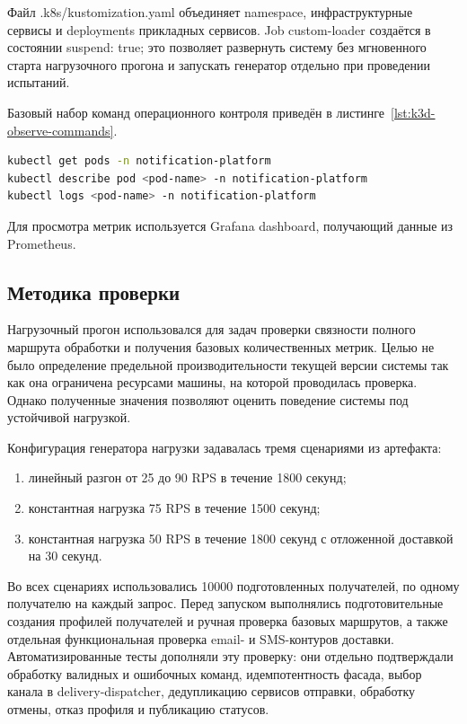 Файл .k8s/kustomization.yaml объединяет namespace, инфраструктурные сервисы и deployments прикладных сервисов. Job custom-loader создаётся в состоянии suspend: true; это позволяет развернуть систему без мгновенного старта нагрузочного прогона и запускать генератор отдельно при проведении испытаний.

Базовый набор команд операционного контроля приведён в листинге~\ref{lst:k3d-observe-commands}.
\begin{lstlisting}[language=bash,caption={Команды контроля состояния k3d-стенда},label={lst:k3d-observe-commands}]
kubectl get pods -n notification-platform
kubectl describe pod <pod-name> -n notification-platform
kubectl logs <pod-name> -n notification-platform
\end{lstlisting}

Для просмотра метрик используется Grafana dashboard, получающий данные из Prometheus.

\subsection{Методика проверки}

Нагрузочный прогон использовался для задач проверки связности полного маршрута обработки и получения базовых количественных метрик. Целью не было определение предельной производительности текущей версии системы так как она ограничена ресурсами машины, на которой проводилась проверка. Однако полученные значения позволяют оценить поведение системы под устойчивой нагрузкой.

Конфигурация генератора нагрузки задавалась тремя сценариями из артефакта:
\begin{enumerate}
    \item линейный разгон от 25 до 90 RPS в течение 1800 секунд;
    \item константная нагрузка 75 RPS в течение 1500 секунд;
    \item константная нагрузка 50 RPS в течение 1800 секунд с отложенной доставкой на 30 секунд.
\end{enumerate}

Во всех сценариях использовались 10000 подготовленных получателей, по одному получателю на каждый запрос.
Перед запуском выполнялись подготовительные создания профилей получателей и ручная проверка базовых маршрутов, а также отдельная функциональная проверка email- и SMS-контуров доставки. Автоматизированные тесты дополняли эту проверку: они отдельно подтверждали обработку валидных и ошибочных команд, идемпотентность фасада, выбор канала в delivery-dispatcher, дедупликацию сервисов отправки, обработку отмены, отказ профиля и публикацию статусов.

